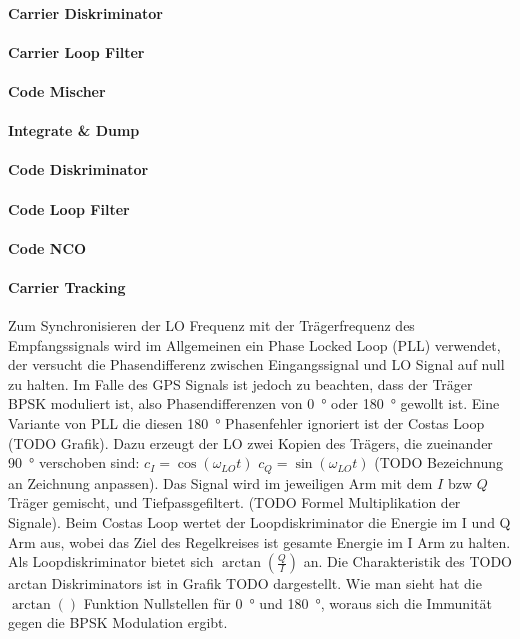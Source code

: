 \paragraph{Carrier Diskriminator}

\paragraph{Carrier Loop Filter}


\paragraph{Code Mischer}
\paragraph{Integrate \& Dump}
\paragraph{Code Diskriminator}
\paragraph{Code Loop Filter}
\paragraph{Code NCO}


\paragraph{Carrier Tracking}
Zum Synchronisieren der LO Frequenz mit der Trägerfrequenz des Empfangssignals wird im Allgemeinen ein Phase Locked Loop (PLL) verwendet, der versucht die Phasendifferenz zwischen Eingangssignal und LO Signal auf null zu halten. Im Falle des GPS Signals ist jedoch zu beachten, dass der Träger BPSK moduliert ist, also Phasendifferenzen von \SI{0}{\degree} oder \SI{180}{\degree} gewollt ist. Eine Variante von PLL die diesen \SI{180}{\degree} Phasenfehler ignoriert ist der Costas Loop (TODO Grafik).
Dazu erzeugt der LO zwei Kopien des Trägers, die zueinander \SI{90}{\degree} verschoben sind: $c_I=\cos(\omega_{LO} t)$ $c_Q=\sin(\omega_{LO} t)$ (TODO Bezeichnung an Zeichnung anpassen). Das Signal wird im jeweiligen Arm mit dem $I$ bzw $Q$ Träger gemischt, und Tiefpassgefiltert. (TODO Formel Multiplikation der Signale). Beim Costas Loop wertet der Loopdiskriminator die Energie im I und Q Arm aus, wobei das Ziel des Regelkreises ist gesamte Energie im I Arm zu halten. Als Loopdiskriminator bietet sich $\arctan\left(\frac{Q}{I}\right)$ an. Die Charakteristik des TODO arctan Diskriminators ist in Grafik TODO dargestellt. Wie man sieht hat die $\arctan()$ Funktion Nullstellen für \SI{0}{\degree} und \SI{180}{\degree}, woraus sich die Immunität gegen die BPSK Modulation ergibt.

